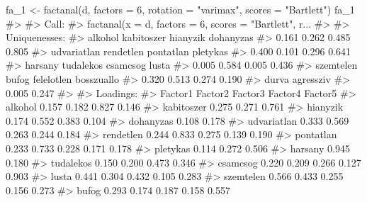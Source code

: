 \documentclass[
  letterpaper,
]{krantz}
\makeatletter
\newenvironment{Shaded}{\begin{snugshade}}{\end{snugshade}}
\newcommand{\AttributeTok}[1]{\textcolor[rgb]{0.40,0.45,0.13}{#1}}
\newcommand{\CommentTok}[1]{\textcolor[rgb]{0.37,0.37,0.37}{#1}}
\newcommand{\DecValTok}[1]{\textcolor[rgb]{0.68,0.00,0.00}{#1}}
\newcommand{\FunctionTok}[1]{\textcolor[rgb]{0.28,0.35,0.67}{#1}}
\newcommand{\NormalTok}[1]{\textcolor[rgb]{0.00,0.23,0.31}{#1}}
\newcommand{\OtherTok}[1]{\textcolor[rgb]{0.00,0.23,0.31}{#1}}
\newcommand{\StringTok}[1]{\textcolor[rgb]{0.13,0.47,0.30}{#1}}
\newenvironment{kframe}{%
\medskip{}
\setlength{\fboxsep}{.8em}
 \def\at@end@of@kframe{}%
 \ifinner\ifhmode%
  \def\at@end@of@kframe{\end{minipage}}%
  \begin{minipage}{\columnwidth}%
 \fi\fi%
 \def\FrameCommand##1{\hskip\@totalleftmargin \hskip-\fboxsep
 \colorbox{shadecolor}{##1}\hskip-\fboxsep
     \hskip-\linewidth \hskip-\@totalleftmargin \hskip\columnwidth}%
 \MakeFramed {\advance\hsize-\width
   \@totalleftmargin\z@ \linewidth\hsize
   \@setminipage}}%
 {\par\unskip\endMakeFramed%
 \at@end@of@kframe}
\renewenvironment{Shaded}{\begin{kframe}}{\end{kframe}}
\makeatother
\begin{document}
\begin{Shaded}
\begin{Highlighting}[]
\NormalTok{fa\_1 }\OtherTok{\textless{}{-}} \FunctionTok{factanal}\NormalTok{(d, }\AttributeTok{factors =} \DecValTok{6}\NormalTok{, }\AttributeTok{rotation =} \StringTok{"varimax"}\NormalTok{, }\AttributeTok{scores =} \StringTok{"Bartlett"}\NormalTok{)}
\NormalTok{fa\_1}
\CommentTok{\#\textgreater{} }
\CommentTok{\#\textgreater{} Call:}
\CommentTok{\#\textgreater{} factanal(x = d, factors = 6, scores = "Bartlett", r...}
\CommentTok{\#\textgreater{} }
\CommentTok{\#\textgreater{} Uniquenesses:}
\CommentTok{\#\textgreater{}     alkohol  kabitoszer    hianyzik   dohanyzas }
\CommentTok{\#\textgreater{}       0.161       0.262       0.485       0.805 }
\CommentTok{\#\textgreater{} udvariatlan   rendetlen   pontatlan    pletykas }
\CommentTok{\#\textgreater{}       0.400       0.101       0.296       0.641 }
\CommentTok{\#\textgreater{}     harsany   tudalekos    csamcsog       lusta }
\CommentTok{\#\textgreater{}       0.005       0.584       0.005       0.436 }
\CommentTok{\#\textgreater{}   szemtelen       bufog  felelotlen  bosszuallo }
\CommentTok{\#\textgreater{}       0.320       0.513       0.274       0.190 }
\CommentTok{\#\textgreater{}       durva   agressziv }
\CommentTok{\#\textgreater{}       0.005       0.247 }
\CommentTok{\#\textgreater{} }
\CommentTok{\#\textgreater{} Loadings:}
\CommentTok{\#\textgreater{}             Factor1 Factor2 Factor3 Factor4 Factor5}
\CommentTok{\#\textgreater{} alkohol      0.157   0.182           0.827   0.146 }
\CommentTok{\#\textgreater{} kabitoszer   0.275   0.271           0.761         }
\CommentTok{\#\textgreater{} hianyzik     0.174   0.552           0.383   0.104 }
\CommentTok{\#\textgreater{} dohanyzas            0.108           0.178         }
\CommentTok{\#\textgreater{} udvariatlan  0.333   0.569   0.263   0.244   0.184 }
\CommentTok{\#\textgreater{} rendetlen    0.244   0.833   0.275   0.139   0.190 }
\CommentTok{\#\textgreater{} pontatlan    0.233   0.733   0.228   0.171   0.178 }
\CommentTok{\#\textgreater{} pletykas     0.114   0.272   0.506                 }
\CommentTok{\#\textgreater{} harsany                      0.945           0.180 }
\CommentTok{\#\textgreater{} tudalekos    0.150   0.200   0.473           0.346 }
\CommentTok{\#\textgreater{} csamcsog     0.220   0.209   0.266   0.127   0.903 }
\CommentTok{\#\textgreater{} lusta        0.441   0.304   0.432   0.105   0.283 }
\CommentTok{\#\textgreater{} szemtelen    0.566   0.433   0.255   0.156   0.273 }
\CommentTok{\#\textgreater{} bufog        0.293   0.174   0.187   0.158   0.557 }

\end{Highlighting}
\end{Shaded}
\end{document}
